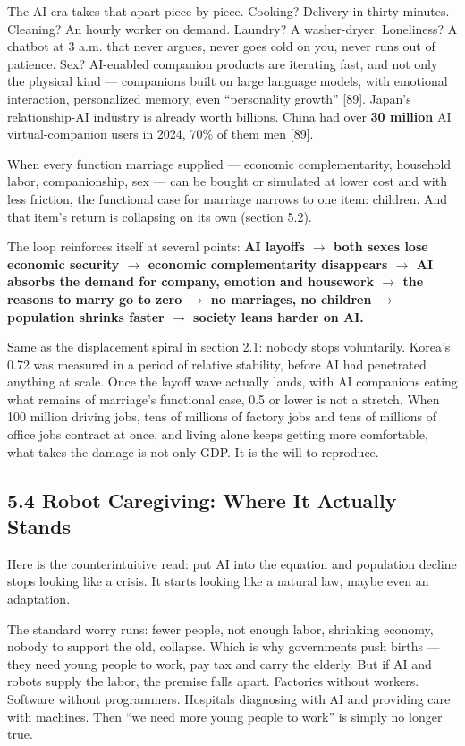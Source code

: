 \documentclass[11pt,a4paper]{article}
\begin{document}
The AI era takes that apart piece by piece. Cooking? Delivery in thirty minutes. Cleaning? An hourly worker on demand. Laundry? A washer-dryer. Loneliness? A chatbot at 3 a.m. that never argues, never goes cold on you, never runs out of patience. Sex? AI-enabled companion products are iterating fast, and not only the physical kind --- companions built on large language models, with emotional interaction, personalized memory, even ``personality growth'' [89]. Japan's relationship-AI industry is already worth billions. China had over \textbf{30 million} AI virtual-companion users in 2024, 70\% of them men [89].

When every function marriage supplied --- economic complementarity, household labor, companionship, sex --- can be bought or simulated at lower cost and with less friction, the functional case for marriage narrows to one item: children. And that item's return is collapsing on its own (section 5.2).

The loop reinforces itself at several points: \textbf{AI layoffs $\to$ both sexes lose economic security $\to$ economic complementarity disappears $\to$ AI absorbs the demand for company, emotion and housework $\to$ the reasons to marry go to zero $\to$ no marriages, no children $\to$ population shrinks faster $\to$ society leans harder on AI.}

Same as the displacement spiral in section 2.1: nobody stops voluntarily. Korea's 0.72 was measured in a period of relative stability, before AI had penetrated anything at scale. Once the layoff wave actually lands, with AI companions eating what remains of marriage's functional case, 0.5 or lower is not a stretch. When 100 million driving jobs, tens of millions of factory jobs and tens of millions of office jobs contract at once, and living alone keeps getting more comfortable, what takes the damage is not only GDP. It is the will to reproduce.

\subsection{5.4 Robot Caregiving: Where It Actually Stands}

Here is the counterintuitive read: put AI into the equation and population decline stops looking like a crisis. It starts looking like a natural law, maybe even an adaptation.

The standard worry runs: fewer people, not enough labor, shrinking economy, nobody to support the old, collapse. Which is why governments push births --- they need young people to work, pay tax and carry the elderly. But if AI and robots supply the labor, the premise falls apart. Factories without workers. Software without programmers. Hospitals diagnosing with AI and providing care with machines. Then ``we need more young people to work'' is simply no longer true.
\end{document}
